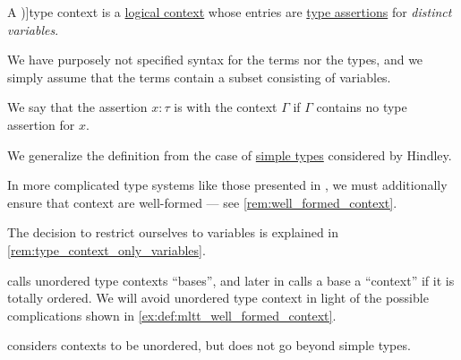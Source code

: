 \begin{definition}\label{def:type_context}
  A \term[en=type-context (\cite[def. 2A5]{Hindley1997BasicSTT})]{type context} is a \hyperref[def:logical_context]{logical context} whose entries are \hyperref[def:type_assertion]{type assertions} for \emph{distinct variables}.

  We have purposely not specified syntax for the terms nor the types, and we simply assume that the terms contain a subset consisting of variables.

  We say that the assertion \( x: \tau \) is  with the context \( \Gamma \) if \( \Gamma \) contains no type assertion for \( x \).
\end{definition}
\begin{comments}
  \item We generalize the definition from the case of \hyperref[def:simple_type]{simple types} considered by Hindley.

  \item In more complicated type systems like those presented in , we must additionally ensure that context are well-formed --- see \cref{rem:well_formed_context}.

  \item The decision to restrict ourselves to variables is explained in \cref{rem:type_context_only_variables}.

  \item \Textcite[def. 5.1.1]{Barendregt1992LambdaCalculiWithTypes} calls unordered type contexts \enquote{bases}, and later in \cite[def. 5.1.5]{Barendregt1992LambdaCalculiWithTypes} calls a base a \enquote{context} if it is totally ordered. We will avoid unordered type context in light of the possible complications shown in \cref{ex:def:mltt_well_formed_context}.

  \textcite[note 2A5.2]{Hindley1997BasicSTT} considers contexts to be unordered, but does not go beyond simple types.
\end{comments}

